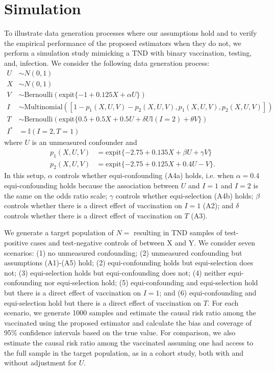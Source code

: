\documentclass[11pt]{article}
\begin{document}
\section{Simulation}

To illustrate data generation processes where our assumptions hold and to verify the empirical performance of the proposed estimators when they do not, we perform a simulation study mimicking a TND with binary vaccination, testing, and, infection. We
consider the following data generation process:
    \begin{align*}
        U &\sim N(0,1)\\
        X &\sim N(0,1)\\
        V &\sim \text{Bernoulli}(\text{expit}\{-1 + 0.125 X + \alpha U\})\\
        I &\sim \text{Multinomial}([1 - p_1(X,U,V) - p_2(X,U,V), p_1(X, U,V), p_2(X,U,V)])\\
        T &\sim \text{Bernoulli}(\text{expit}\{0.5 + 0.5 X + 0.5 U + \delta U \mathbb{I}(I = 2) + \theta V \}) \\
        I^* &= \mathbb{I}(I = 2, T = 1)
    \end{align*}
where $U$ is an unmeasured confounder and
    \begin{align*}
        p_1(X,U,V) &= \text{expit}\{-2.75 + 0.135 X + \beta U + \gamma V\} \\
        p_2(X,U,V) & = \text{expit}\{-2.75 + 0.125 X + 0.4 U - V\}.
    \end{align*}
In this setup, $\alpha$ controls whether equi-confounding (A4a) holds, i.e. when $\alpha = 0.4$ equi-confounding holds because the association between $U$ and $I=1$ and $I=2$ is the same on the odds ratio scale; $\gamma$ controls whether equi-selection (A4b) holds; $\beta$ controls whether there is a direct effect of vaccination on $I = 1$ (A2); and $\delta$ controls whether there is a direct effect of vaccination on $T$ (A3).

We generate a target population of $N = $ resulting in TND samples of test-positive cases and test-negative controls of between X and Y. We consider seven scenarios: (1) no unmeasured confounding; (2) unmeasured confounding but assumptions (A1)-(A5) hold; (2) equi-confounding holds but equi-selection does not; (3) equi-selection holds but equi-confounding does not; (4) neither equi-confounding nor equi-selection hold; (5) equi-confounding and equi-selection hold but there is a direct effect of vaccination on $I = 1$; and (6) equi-confounding and equi-selection hold but there is a direct effect of vaccination on $T$. For each scenario, we generate 1000 samples and estimate the causal risk ratio among the vaccinated using the proposed estimator and calculate the bias and coverage of 95\% confidence intervals based on the true value. For comparison, we also estimate the causal risk ratio among the vaccinated assuming one had access to the full sample in the target population, as in a cohort study, both with and without adjustment for $U$.
\end{document}
